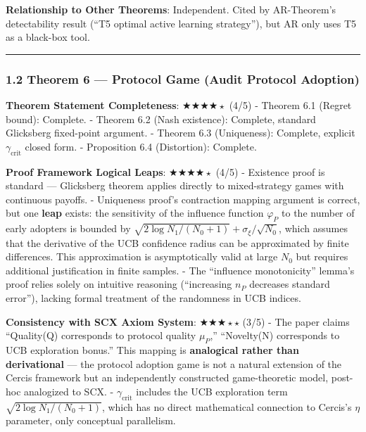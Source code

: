 \documentclass[
  12pt,
]{article}
\begin{document}
\textbf{Relationship to Other Theorems}: Independent. Cited by AR-Theorem's detectability result (``T5 optimal active learning strategy''), but AR only uses T5 as a black-box tool.

\begin{center}\rule{0.5\linewidth}{0.5pt}\end{center}

\subsubsection{1.2 Theorem 6 --- Protocol Game (Audit Protocol Adoption)}\label{theorem-6-protocol-game-audit-protocol-adoption}

\textbf{Theorem Statement Completeness}: $\bigstar\bigstar\bigstar\bigstar{\scriptstyle\star}$ (4/5)
- Theorem 6.1 (Regret bound): Complete.
- Theorem 6.2 (Nash existence): Complete, standard Glicksberg fixed-point argument.
- Theorem 6.3 (Uniqueness): Complete, explicit $\gamma_{\text{crit}}$ closed form.
- Proposition 6.4 (Distortion): Complete.

\textbf{Proof Framework Logical Leaps}: $\bigstar\bigstar\bigstar\bigstar{\scriptstyle\star}$ (4/5)
- Existence proof is standard --- Glicksberg theorem applies directly to mixed-strategy games with continuous payoffs.
- Uniqueness proof's contraction mapping argument is correct, but one \textbf{leap} exists: the sensitivity of the influence function $\varphi_P$ to the number of early adopters is bounded by $\sqrt{2\log N_1/(N_0+1)} + \sigma_\xi/\sqrt{N_0}$, which assumes that the derivative of the UCB confidence radius can be approximated by finite differences. This approximation is asymptotically valid at large $N_0$ but requires additional justification in finite samples.
- The ``influence monotonicity'' lemma's proof relies solely on intuitive reasoning (``increasing $n_P$ decreases standard error''), lacking formal treatment of the randomness in UCB indices.

\textbf{Consistency with SCX Axiom System}: $\bigstar\bigstar\bigstar{\scriptstyle\star}{\scriptstyle\star}$ (3/5)
- The paper claims ``Quality(Q) corresponds to protocol quality $\mu_P$,'' ``Novelty(N) corresponds to UCB exploration bonus.'' This mapping is \textbf{analogical rather than derivational} --- the protocol adoption game is not a natural extension of the Cercis framework but an independently constructed game-theoretic model, post-hoc analogized to SCX.
- $\gamma_{\text{crit}}$ includes the UCB exploration term $\sqrt{2\log N_1/(N_0+1)}$, which has no direct mathematical connection to Cercis's $\eta$ parameter, only conceptual parallelism.
\end{document}
